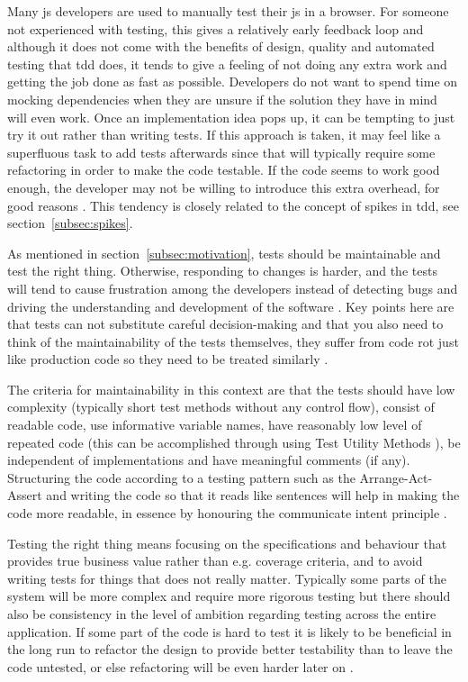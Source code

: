 \documentclass[11pt]{article}
\begin{document}
Many \gls{js} developers are used to manually test their \gls{js} in a browser. For someone not experienced with testing, this gives a relatively early feedback loop and although it does not come with the benefits of design, quality and automated testing that \gls{tdd} does, it tends to give a feeling of not doing any extra work and getting the job done as fast as possible. Developers do not want to spend time on mocking dependencies when they are unsure if the solution they have in mind will even work. Once an implementation idea pops up, it can be tempting to just try it out rather than writing tests. If this approach is taken, it may feel like a superfluous task to add tests afterwards since that will typically require some refactoring in order to make the code testable. If the code seems to work good enough, the developer may not be willing to introduce this extra overhead, for good reasons \cite[question~43]{Stenmark}. This tendency is closely related to the concept of spikes in \gls{tdd}, see section~\ref{subsec:spikes}.

As mentioned in section~\ref{subsec:motivation}, tests should be maintainable and test the right thing. Otherwise, responding to changes is harder, and the tests will tend to cause frustration among the developers instead of detecting bugs and driving the understanding and development of the software \cite{Clean}. Key points here are that tests can not substitute careful decision-making and that you also need to think of the maintainability of the tests themselves, they suffer from code rot just like production code so they need to be treated similarly \cite[question~36]{Ahnve}\cite[p.~123-133]{Clean}.

The criteria for maintainability in this context are that the tests should have low complexity (typically short test methods without any control flow), consist of readable code, use informative variable names, have reasonably low level of repeated code (this can be accomplished through using Test Utility Methods \cite[599]{TestPatterns}), be independent of implementations and have meaningful comments (if any). Structuring the code according to a testing pattern such as the Arrange-Act-Assert \cite{C2} and writing the code so that it reads like sentences will help in making the code more readable, in essence by honouring the communicate intent principle \cite[p.~41]{TestPatterns}.

Testing the right thing means focusing on the specifications and behaviour that provides true business value rather than e.g. coverage criteria, and to avoid writing tests for things that does not really matter. Typically some parts of the system will be more complex and require more rigorous testing but there should also be consistency in the level of ambition regarding testing across the entire application. If some part of the code is hard to test it is likely to be beneficial in the long run to refactor the design to provide better testability than to leave the code untested, or else refactoring will be even harder later on \cite{Refactoring}. %
\end{document}
